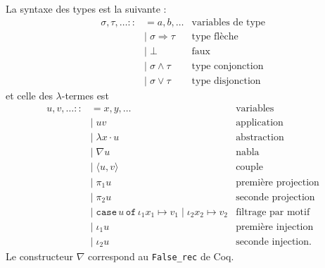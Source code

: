 \documentclass[a4paper]{article}
\begin{document}
La syntaxe des types est la suivante :
\begin{align*}
\sigma, \tau, \ldots ::&= a, b, \ldots & \text{variables de type} \\
&| \; \sigma \Rightarrow \tau & \text{type flèche} \\
&| \; \bot & \text{faux} \\
&| \; \sigma \wedge \tau & \text{type conjonction} \\
&| \; \sigma \vee \tau & \text{type disjonction}
\end{align*} et celle des $\lambda$-termes est \begin{align*}
u, v, \ldots ::&= x, y, \ldots & \text{variables}\\
&| \; uv & \text{application} \\
&| \; \lambda x \cdot u & \text{abstraction} \\
&| \; \nabla u & \text{nabla} \\
&| \; \langle u, v \rangle & \text{couple} \\
&| \; \pi_1 u & \text{première projection} \\
&| \; \pi_2 u & \text{seconde projection} \\
&| \; \mathtt{case} \, u \, \mathtt{of} \, \iota_1 x_1 \mapsto v_1 \; | \; \iota_2 x_2 \mapsto v_2 & \text{filtrage par motif} \\
&| \; \iota_1 u & \text{première injection} \\
&| \; \iota_2 u & \text{seconde injection}.
\end{align*} Le constructeur $\nabla$ correspond au \verb+False_rec+ de Coq.
\medskip
\end{document}
